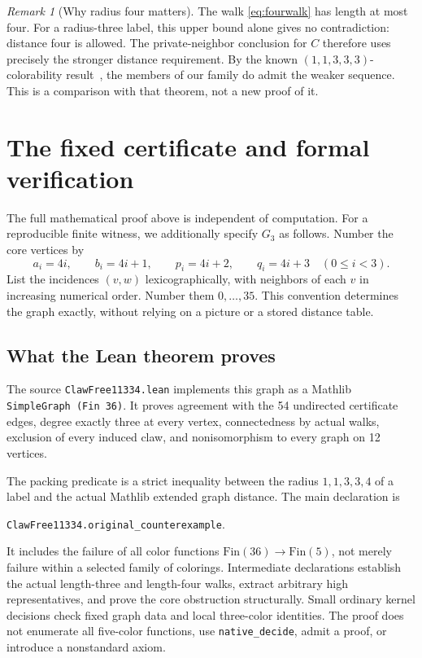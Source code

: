 \documentclass[11pt,a4paper]{article}
\theoremstyle{definition}
\theoremstyle{remark}
\newtheorem{remark}[theorem]{Remark}
\newcommand{\weakpalette}{(1,1,3,3,3)}
\begin{document}
\begin{remark}[Why radius four matters]
The walk \eqref{eq:fourwalk} has length at most four. For a
radius-three label, this upper bound alone gives no contradiction:
distance four is allowed. The private-neighbor conclusion for \(C\)
therefore uses precisely the stronger distance requirement. By the
known \(\weakpalette\)-colorability result~\cite[Theorem~4]{MEAH},
the members of our family do admit the weaker sequence. This is a
comparison with that theorem, not a new proof of it.
\end{remark}

\section{The fixed certificate and formal verification}

The full mathematical proof above is independent of computation.
For a reproducible finite witness, we additionally specify \(G_3\)
as follows. Number the core vertices by
\[
 a_i=4i,\qquad b_i=4i+1,\qquad p_i=4i+2,\qquad q_i=4i+3
 \quad(0\leq i<3).
\]
List the incidences \((v,w)\) lexicographically, with neighbors of
each \(v\) in increasing numerical order. Number them \(0,\ldots,35\).
This convention determines the graph exactly, without relying on a
picture or a stored distance table.

\subsection{What the Lean theorem proves}

The source \texttt{ClawFree11334.lean} implements this graph as a
Mathlib \texttt{SimpleGraph (Fin 36)}. It proves agreement with the
54 undirected certificate edges, degree exactly three at every
vertex, connectedness by actual walks, exclusion of every induced
claw, and nonisomorphism to every graph on 12 vertices.

The packing predicate is a strict inequality between the radius
\(1,1,3,3,4\) of a label and the actual Mathlib extended graph
distance. The main declaration is
\begin{center}
\texttt{ClawFree11334.original\_counterexample}.
\end{center}
It includes the failure of all color functions
\(\mathrm{Fin}(36)\to\mathrm{Fin}(5)\), not merely failure within a
selected family of colorings. Intermediate declarations establish
the actual length-three and length-four walks, extract arbitrary
high representatives, and prove the core obstruction structurally.
Small ordinary kernel decisions check fixed graph data and local
three-color identities. The proof does not enumerate all five-color
functions, use \texttt{native\_decide}, admit a proof, or introduce
a nonstandard axiom.
\end{document}
